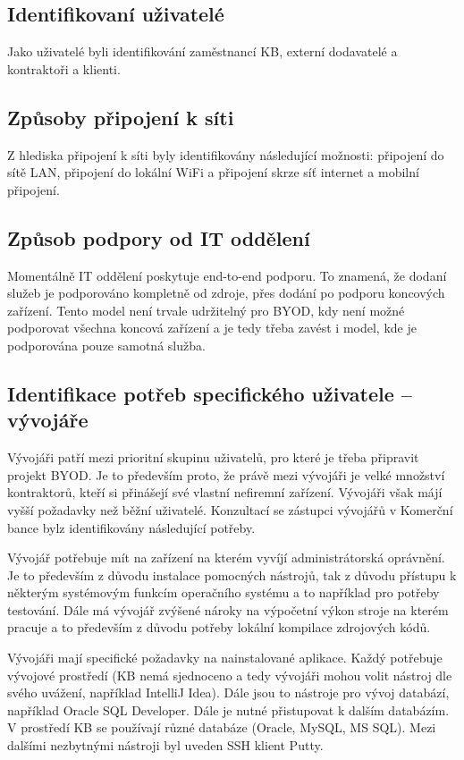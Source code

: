 \subsection{Identifikovaní uživatelé}
Jako uživatelé byli identifikování zaměstnancí KB, externí dodavatelé a kontraktoři a klienti.

\subsection{Způsoby připojení k síti}
Z hlediska připojení k síti byly identifikovány následující možnosti: připojení do sítě LAN, připojení do lokální WiFi a připojení skrze síť internet a mobilní připojení.

\subsection{Způsob podpory od IT oddělení}
Momentálně IT oddělení poskytuje end-to-end podporu. To znamená, že dodaní služeb je podporováno kompletně od zdroje, přes dodání po podporu koncových zařízení. Tento model není trvale udržitelný pro BYOD, kdy není možné podporovat všechna koncová zařízení a je tedy třeba zavést i model, kde je podporována pouze samotná služba.

\subsection{Identifikace potřeb specifického uživatele -- vývojáře}
Vývojáři patří mezi prioritní skupinu uživatelů, pro které je třeba připravit projekt BYOD. Je to především proto, že právě mezi vývojáři je velké množství kontraktorů, kteří si přinášejí své vlastní nefiremní zařízení. Vývojáři však májí vyšší požadavky než běžní uživatelé. Konzultací se zástupci vývojářů v Komerční bance bylz identifikovány následující potřeby. 

Vývojář potřebuje mít na zařízení na kterém vyvíjí administrátorská oprávnění. Je to především z důvodu instalace pomocných nástrojů, tak z důvodu přístupu k některým systémovým funkcím operačního systému a to například pro potřeby testování. Dále má vývojář zvýšené nároky na výpočetní výkon stroje na kterém pracuje a to především z důvodu potřeby lokální kompilace zdrojových kódů. 

Vývojáři mají specifické požadavky na nainstalované aplikace. Každý potřebuje vývojové prostředí (KB nemá sjednoceno a tedy vývojáři mohou volit nástroj dle svého uvážení, například IntelliJ Idea). Dále jsou to nástroje pro vývoj databází, například Oracle SQL Developer. Dále je nutné přistupovat k dalším databázím. V prostředí KB se používají různé databáze (Oracle, MySQL, MS SQL). Mezi dalšími nezbytnými nástroji byl uveden SSH klient Putty.

